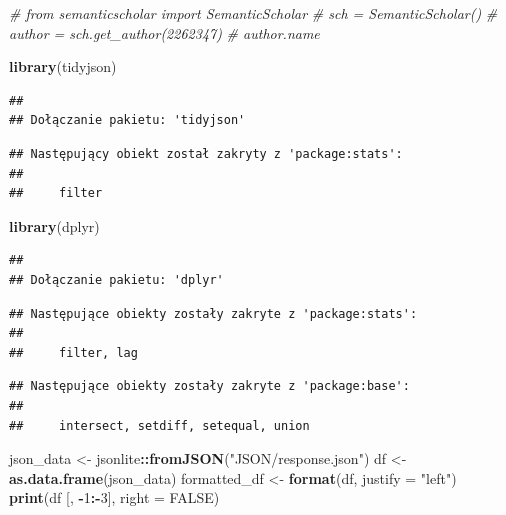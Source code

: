 \documentclass[
]{article}
\newenvironment{Shaded}{\begin{snugshade}}{\end{snugshade}}
\newcommand{\AttributeTok}[1]{\textcolor[rgb]{0.13,0.29,0.53}{#1}}
\newcommand{\CommentTok}[1]{\textcolor[rgb]{0.56,0.35,0.01}{\textit{#1}}}
\newcommand{\ConstantTok}[1]{\textcolor[rgb]{0.56,0.35,0.01}{#1}}
\newcommand{\DecValTok}[1]{\textcolor[rgb]{0.00,0.00,0.81}{#1}}
\newcommand{\FunctionTok}[1]{\textcolor[rgb]{0.13,0.29,0.53}{\textbf{#1}}}
\newcommand{\NormalTok}[1]{#1}
\newcommand{\OtherTok}[1]{\textcolor[rgb]{0.56,0.35,0.01}{#1}}
\newcommand{\SpecialCharTok}[1]{\textcolor[rgb]{0.81,0.36,0.00}{\textbf{#1}}}
\newcommand{\StringTok}[1]{\textcolor[rgb]{0.31,0.60,0.02}{#1}}
\begin{document}
\begin{Shaded}
\begin{Highlighting}[]

\CommentTok{\# from semanticscholar import SemanticScholar}
\CommentTok{\# sch = SemanticScholar()}
\CommentTok{\# author = sch.get\_author(2262347)}
\CommentTok{\# author.name}
\end{Highlighting}
\end{Shaded}

\begin{Shaded}
\begin{Highlighting}[]
\FunctionTok{library}\NormalTok{(tidyjson) }
\end{Highlighting}
\end{Shaded}

\begin{verbatim}
## 
## Dołączanie pakietu: 'tidyjson'
\end{verbatim}

\begin{verbatim}
## Następujący obiekt został zakryty z 'package:stats':
## 
##     filter
\end{verbatim}

\begin{Shaded}
\begin{Highlighting}[]
\FunctionTok{library}\NormalTok{(dplyr)}
\end{Highlighting}
\end{Shaded}

\begin{verbatim}
## 
## Dołączanie pakietu: 'dplyr'
\end{verbatim}

\begin{verbatim}
## Następujące obiekty zostały zakryte z 'package:stats':
## 
##     filter, lag
\end{verbatim}

\begin{verbatim}
## Następujące obiekty zostały zakryte z 'package:base':
## 
##     intersect, setdiff, setequal, union
\end{verbatim}

\begin{Shaded}
\begin{Highlighting}[]
\NormalTok{json\_data }\OtherTok{\textless{}{-}}\NormalTok{ jsonlite}\SpecialCharTok{::}\FunctionTok{fromJSON}\NormalTok{(}\StringTok{"JSON/response.json"}\NormalTok{) }
\NormalTok{df }\OtherTok{\textless{}{-}} \FunctionTok{as.data.frame}\NormalTok{(json\_data) }
\NormalTok{formatted\_df }\OtherTok{\textless{}{-}} \FunctionTok{format}\NormalTok{(df, }\AttributeTok{justify =} \StringTok{"left"}\NormalTok{)}
\FunctionTok{print}\NormalTok{(df [, }\SpecialCharTok{{-}}\DecValTok{1}\SpecialCharTok{:{-}}\DecValTok{3}\NormalTok{], }\AttributeTok{right =} \ConstantTok{FALSE}\NormalTok{)}
\end{Highlighting}
\end{Shaded}
\end{document}
